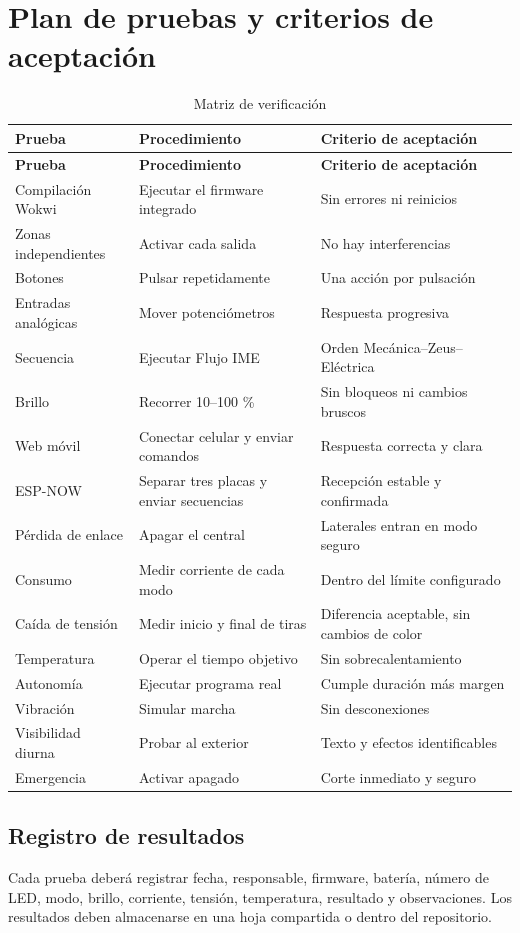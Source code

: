 \documentclass[11pt,a4paper]{article}
\begin{document}
\section{Plan de pruebas y criterios de aceptación}
\begin{longtable}{@{}P{3.0cm}P{6.7cm}P{4.8cm}@{}}
\caption{Matriz de verificación}\\
\toprule
\textbf{Prueba} & \textbf{Procedimiento} & \textbf{Criterio de aceptación}\\
\midrule
\endfirsthead
\toprule
\textbf{Prueba} & \textbf{Procedimiento} & \textbf{Criterio de aceptación}\\
\midrule
\endhead
Compilación Wokwi & Ejecutar el firmware integrado & Sin errores ni reinicios\\
Zonas independientes & Activar cada salida & No hay interferencias\\
Botones & Pulsar repetidamente & Una acción por pulsación\\
Entradas analógicas & Mover potenciómetros & Respuesta progresiva\\
Secuencia & Ejecutar Flujo IME & Orden Mecánica--Zeus--Eléctrica\\
Brillo & Recorrer 10--100 \% & Sin bloqueos ni cambios bruscos\\
Web móvil & Conectar celular y enviar comandos & Respuesta correcta y clara\\
ESP-NOW & Separar tres placas y enviar secuencias & Recepción estable y confirmada\\
Pérdida de enlace & Apagar el central & Laterales entran en modo seguro\\
Consumo & Medir corriente de cada modo & Dentro del límite configurado\\
Caída de tensión & Medir inicio y final de tiras & Diferencia aceptable, sin cambios de color\\
Temperatura & Operar el tiempo objetivo & Sin sobrecalentamiento\\
Autonomía & Ejecutar programa real & Cumple duración más margen\\
Vibración & Simular marcha & Sin desconexiones\\
Visibilidad diurna & Probar al exterior & Texto y efectos identificables\\
Emergencia & Activar apagado & Corte inmediato y seguro\\
\bottomrule
\end{longtable}

\subsection{Registro de resultados}
Cada prueba deberá registrar fecha, responsable, firmware, batería, número de LED, modo, brillo, corriente, tensión, temperatura, resultado y observaciones. Los resultados deben almacenarse en una hoja compartida o dentro del repositorio.
\end{document}
